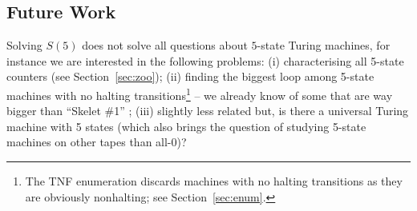 \documentclass[a4paper,british]{article}
\theoremstyle{definition} %
\numberwithin{equation}{section}
\theoremstyle{definition} %
\newcommand{\tsm}[1]{\todo{TS: #1}}
\newcommand{\CoqBB}{Coq-BB5\xspace}
\begin{document}
























% 

\subsection{Future Work}

Solving $S(5)$ does not solve all questions about $5$-state Turing machines, for instance we are interested in the following problems: (i) characterising all 5-state counters (see Section~\ref{sec:zoo}); (ii) finding the biggest loop among 5-state machines with no halting transitions\footnote{The TNF enumeration discards machines with no halting transitions as they are obviously nonhalting; see Section~\ref{sec:enum}.} -- we already know of some that are way bigger than ``Skelet \#1'' \cite{ligocki2022motherofgiants}; (iii) slightly less related but, is there a universal Turing machine with 5 states (which also brings the question of studying 5-state machines on other tapes than all-0)?
\end{document}

